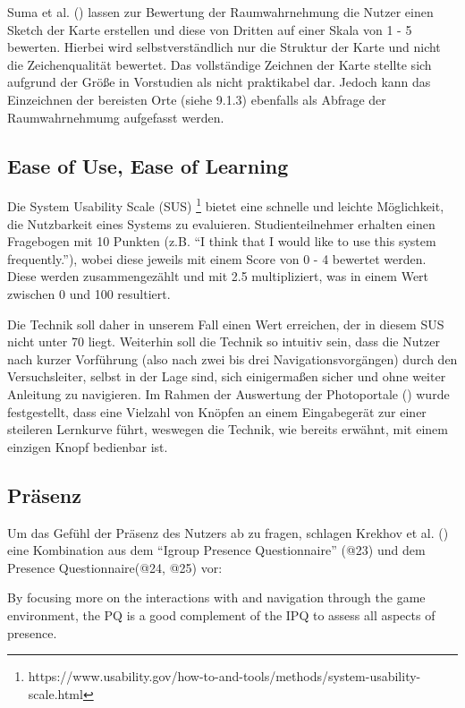 Suma et al. (\cite{Suma2010EvaluationEnvironments}) lassen zur Bewertung der Raumwahrnehmung die Nutzer einen Sketch der Karte erstellen und diese von Dritten auf einer Skala von 1 - 5 bewerten. Hierbei wird selbstverständlich nur die Struktur der Karte und nicht die Zeichenqualität bewertet.
Das vollständige Zeichnen der Karte stellte sich aufgrund der Größe in Vorstudien als nicht praktikabel dar. Jedoch kann das Einzeichnen der bereisten Orte (siehe 9.1.3) ebenfalls als Abfrage der Raumwahrnehmumg
aufgefasst werden.

\subsection{Ease of Use, Ease of Learning}
Die System Usability Scale (SUS) \footnote{https://www.usability.gov/how-to-and-tools/methods/system-usability-scale.html}
bietet eine schnelle und leichte Möglichkeit, die Nutzbarkeit eines Systems zu evaluieren. Studienteilnehmer erhalten einen Fragebogen mit 10 Punkten (z.B. “I think that I would like to use this system frequently.”), wobei diese jeweils mit einem Score von 0 - 4 bewertet werden. Diese werden zusammengezählt und mit 2.5 multipliziert, was in einem Wert zwischen 0 und 100 resultiert.

Die Technik soll daher in unserem Fall einen Wert erreichen, der in diesem SUS nicht unter 70 liegt. Weiterhin soll die Technik so intuitiv sein, dass die Nutzer nach kurzer Vorführung (also nach zwei bis drei Navigationsvorgängen) durch den Versuchsleiter, selbst in der Lage sind, sich einigermaßen sicher und ohne weiter Anleitung zu navigieren. Im Rahmen der Auswertung der Photoportale (\cite{Kunert2014Photoportals}) wurde festgestellt, dass eine Vielzahl von Knöpfen an einem Eingabegerät zur einer steileren Lernkurve führt, weswegen die Technik, wie bereits erwähnt, mit einem einzigen Knopf bedienbar ist.


\subsection{Präsenz}
Um das Gefühl der Präsenz des Nutzers ab zu fragen, schlagen Krekhov et al. (\cite{Krekhov2018GulliVR}) eine Kombination aus dem “Igroup Presence Questionnaire” (@23) und dem Presence Questionnaire(@24, @25) vor:

By focusing more on the interactions with and navigation
through the game environment, the PQ is a good complement
of the IPQ to assess all aspects of presence.

